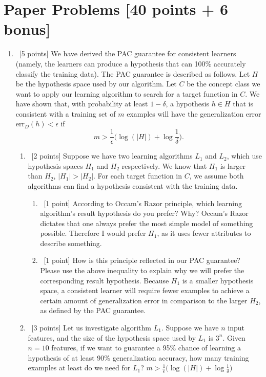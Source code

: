 \documentclass[12pt, fullpage,letterpaper]{article}
\begin{document}
\section{Paper Problems [40 points + 6 bonus]}
\begin{enumerate}
\item~[5 points] We have derived the PAC guarantee for consistent learners (namely, the learners can produce a hypothesis that can 100\% accurately classify the training data). The PAC guarantee is described as follows. Let $H$ be the hypothesis space used by our algorithm. Let $C$ be the concept class we want to apply our learning algorithm to search for a target function in $C$. We have shown that,  with probability at least $1-\delta$, a hypothesis $h\in H$ that is consistent with a training set of $m$ examples will have the generalization error $\mathrm{err}_D(h) < \epsilon$ if 
\[
m > \frac{1}{\epsilon}\big(\log(|H|) + \log\frac{1}{\delta}\big).
\]

\begin{enumerate}
	\item~[2 points] Suppose we have two learning algorithms $L_1$ and $L_2$, which use hypothesis spaces $H_1$ and $H_2$ respectively. We know that $H_1$ is larger than $H_2$, \ie $|H_1| > |H_2|$.
	For each target function in $C$, we assume both algorithms can find a hypothesis consistent with the training data. 
	\begin{enumerate}
		\item~[1 point] According to Occam's Razor principle, which learning algorithm's  result hypothesis do you prefer? Why?
		\bigskip\newline
		Occam's Razor dictates that one always prefer the most simple model of something possible. Therefore I would prefer $H_1$, as it uses fewer attributes to describe something.
		\bigskip
		\item~[1 point]  How is this principle reflected in our PAC guarantee? Please use the above inequality to explain why we will prefer the corresponding result hypothesis. 
		\bigskip\newline
		Because $H_1$ is a smaller hypothesis space, a consistent learner will require fewer examples to achieve a certain amount of generalization error in comparison to the larger $H_2$, as defined by the PAC guarantee.
		\bigskip
	\end{enumerate}
	\item~[3 points] Let us investigate algorithm $L_1$. Suppose we have $n$ input features, and the size of the hypothesis space used by $L_1$ is $3^n$. Given $n=10$ features, if we want to guarantee a 95\% chance of learning a hypothesis of at least 90\% generalization accuracy, how many training examples at least do we need for $L_1$?
	\smallskip\newline
	$m > \frac{1}{\epsilon}\big(\log(|H|) + \log\frac{1}{\delta}\big)$
	

\end{enumerate}
\end{enumerate}
\end{document}
